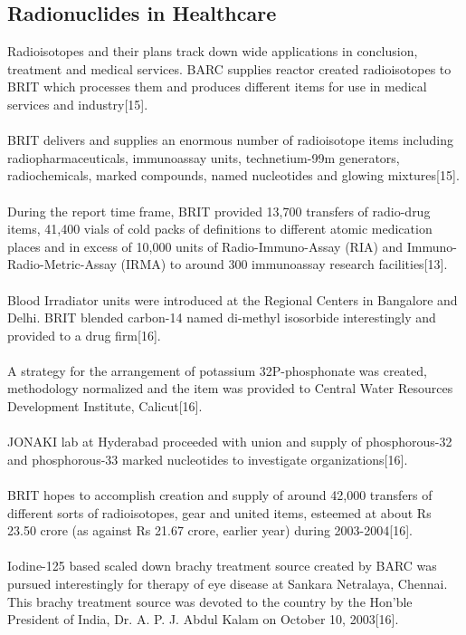 \documentclass[12pt]{article}
\begin{document}
\subsection{Radionuclides in Healthcare}
Radioisotopes and their plans track down wide applications in conclusion, treatment and medical services. BARC supplies reactor created radioisotopes to BRIT which processes them and produces different items for use in medical services and industry[15].
\\
\\
BRIT delivers and supplies an enormous number of radioisotope items including radiopharmaceuticals, immunoassay units, technetium-99m generators, radiochemicals, marked compounds, named nucleotides and glowing mixtures[15].
\\
\\
During the report time frame, BRIT provided 13,700 transfers of radio-drug items, 41,400 vials of cold packs of definitions to different atomic medication places and in excess of 10,000 units of Radio-Immuno-Assay (RIA) and Immuno-Radio-Metric-Assay (IRMA) to around 300 immunoassay research facilities[13].
\\
\\
Blood Irradiator units were introduced at the Regional Centers in Bangalore and Delhi. BRIT blended carbon-14 named di-methyl isosorbide interestingly and provided to a drug firm[16].
\\
\\
A strategy for the arrangement of potassium 32P-phosphonate was created, methodology normalized and the item was provided to Central Water Resources Development Institute, Calicut[16].
\\
\\
JONAKI lab at Hyderabad proceeded with union and supply of phosphorous-32 and phosphorous-33 marked nucleotides to investigate organizations[16].
\\
\\
BRIT hopes to accomplish creation and supply of around 42,000 transfers of different sorts of radioisotopes, gear and united items, esteemed at about Rs 23.50 crore (as against Rs 21.67 crore, earlier year) during 2003-2004[16].
\\
\\
Iodine-125 based scaled down brachy treatment source created by BARC was pursued interestingly for therapy of eye disease at Sankara Netralaya, Chennai. This brachy treatment source was devoted to the country by the Hon'ble President of India, Dr. A. P. J. Abdul Kalam on October 10, 2003[16].
\end{document}
